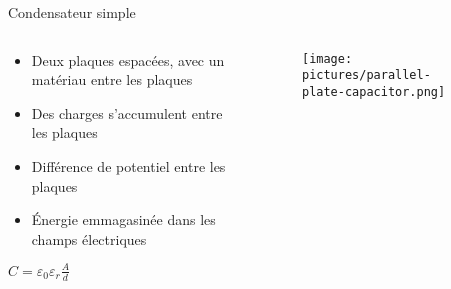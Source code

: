 \begin{frame}{Condensateur simple}
    \begin{columns}
        \begin{column}{0.66\textwidth}
            \begin{itemize}
                \item Deux plaques espacées, avec un matériau entre les plaques
                \item Des charges s'accumulent entre les plaques
                \item Différence de potentiel entre les plaques
                \item Énergie emmagasinée dans les champs électriques
            \end{itemize}
            \par
            \Large{
            \begin{center}
                $C = \varepsilon_0 \varepsilon_r \frac{A}{d}$
            \end{center}
            }
        \end{column}

        \begin{column}{0.33\textwidth}
            \begin{figure}
                \centering
                \texttt{[image: pictures/parallel-plate-capacitor.png]}
            \end{figure}
        \end{column}
    \end{columns}
\end{frame}

